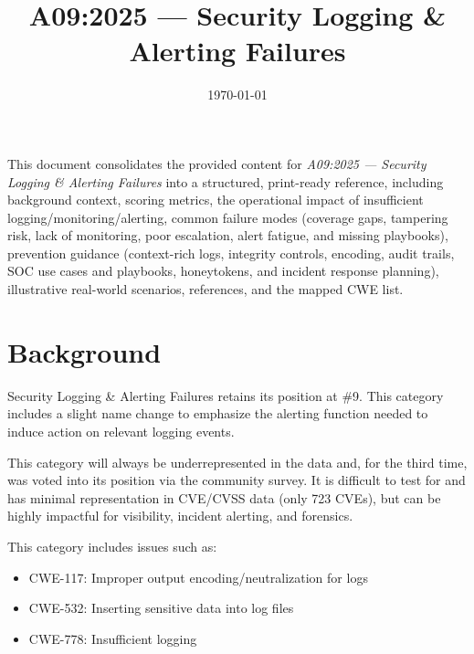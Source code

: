\documentclass[11pt]{article}
\title{\textbf{A09:2025 — Security Logging \& Alerting Failures}}
\date{\today}
\author{} %
\begin{document}
\maketitle

\begin{infobox}
This document consolidates the provided content for \textit{A09:2025 — Security Logging \& Alerting Failures} into a structured, print-ready reference, including background context, scoring metrics, the operational impact of insufficient logging/monitoring/alerting, common failure modes (coverage gaps, tampering risk, lack of monitoring, poor escalation, alert fatigue, and missing playbooks), prevention guidance (context-rich logs, integrity controls, encoding, audit trails, SOC use cases and playbooks, honeytokens, and incident response planning), illustrative real-world scenarios, references, and the mapped CWE list.
\end{infobox}

\tableofcontents
\newpage

\section{Background}
Security Logging \& Alerting Failures retains its position at \#9. This category includes a slight name change to emphasize the alerting function needed to induce action on relevant logging events.

This category will always be underrepresented in the data and, for the third time, was voted into its position via the community survey. It is difficult to test for and has minimal representation in CVE/CVSS data (only 723 CVEs), but can be highly impactful for visibility, incident alerting, and forensics.

This category includes issues such as:
\begin{itemize}
  \item CWE-117: Improper output encoding/neutralization for logs
  \item CWE-532: Inserting sensitive data into log files
  \item CWE-778: Insufficient logging
\end{itemize}
\end{document}
